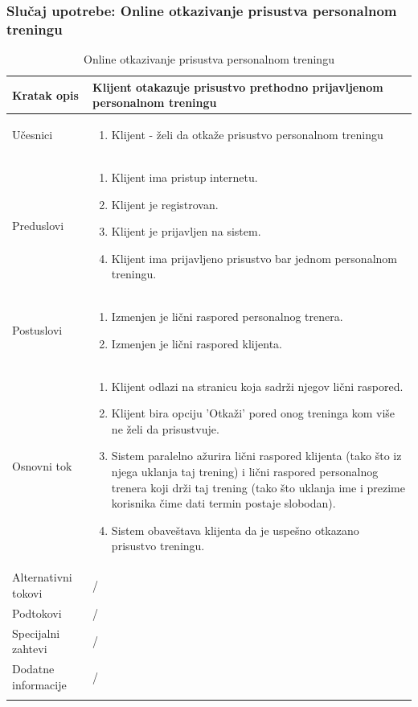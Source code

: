 \subsubsection{Slučaj upotrebe: Online otkazivanje prisustva personalnom treningu}


\begin{longtable}{| p{} | p{} |} 
\hline
    Kratak opis & Klijent otakazuje prisustvo prethodno prijavljenom personalnom treningu \\ 
\hline    
    Učesnici &  
    \begin{enumerate}
    \item Klijent - želi da otkaže prisustvo personalnom treningu
    \end{enumerate}\\
\hline
   Preduslovi & 
   \begin{enumerate}
    \item Klijent ima pristup internetu.
    \item Klijent je registrovan.
    \item Klijent je prijavljen na sistem.
    \item Klijent ima prijavljeno prisustvo bar jednom personalnom treningu.
   \end{enumerate}\\
\hline  
    Postuslovi & 
    \begin{enumerate}
    \item Izmenjen je lični raspored personalnog trenera.
    \item Izmenjen je lični raspored klijenta.
   \end{enumerate} \\
\hline
    Osnovni tok & 
    \begin{enumerate}
    \item Klijent odlazi na stranicu koja sadrži njegov lični raspored.
    \item Klijent bira opciju 'Otkaži' pored onog treninga kom više ne želi da prisustvuje.
    \item Sistem paralelno ažurira lični raspored klijenta (tako što iz njega uklanja taj trening) i lični raspored personalnog trenera koji drži taj trening (tako što uklanja ime i prezime korisnika čime dati termin postaje slobodan).
    \item Sistem obaveštava klijenta da je uspešno otkazano prisustvo treningu.
   \end{enumerate}\\
\hline
    Alternativni tokovi & /\\
\hline
    Podtokovi & /\\
\hline
    Specijalni zahtevi & /\\
\hline
    Dodatne informacije & /\\
\hline
\caption{Online otkazivanje prisustva personalnom treningu}
\end{longtable}




